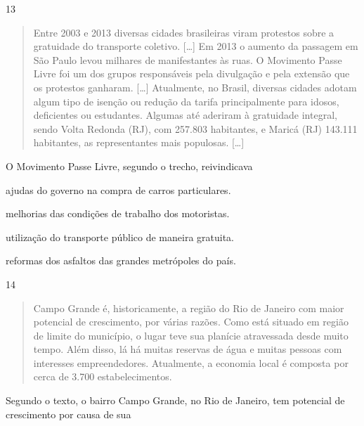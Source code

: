 \pagebreak
\num{13}

\begin{quote}
Entre 2003 e 2013 diversas cidades brasileiras viram protestos sobre a
gratuidade do transporte coletivo. {[}\ldots{}{]} Em 2013 o aumento da passagem em São
Paulo levou milhares de manifestantes às ruas. O Movimento Passe Livre
foi um dos grupos responsáveis pela divulgação e pela extensão que os
protestos ganharam. {[}\ldots{}{]} Atualmente, no Brasil, diversas cidades adotam algum
tipo de isenção ou redução da tarifa principalmente para idosos,
deficientes ou estudantes. Algumas até aderiram à gratuidade integral,
sendo Volta Redonda (RJ), com 257.803 habitantes, e Maricá (RJ) 143.111
habitantes, as representantes mais populosas. {[}\ldots{}{]}

\end{quote}

\noindent{}O Movimento Passe Livre, segundo o trecho, reivindicava

\begin{escolha}
\item ajudas do governo na compra de carros particulares.

\item melhorias das condições de trabalho dos motoristas.

\item utilização do transporte público de maneira gratuita.

\item reformas dos asfaltos das grandes metrópoles do país.
\end{escolha}



\num{14}

\begin{quote}
Campo Grande é, historicamente, a região do Rio de Janeiro com maior
potencial de crescimento, por várias razões. Como está situado em região de limite do município, o lugar teve sua planície atravessada desde muito tempo. Além disso, lá há muitas reservas de água e muitas pessoas com interesses empreendedores. Atualmente, a economia local é composta por cerca de 3.700 estabelecimentos. 
\end{quote}

\pagebreak

Segundo o texto, o bairro Campo Grande, no Rio de Janeiro, tem potencial
de crescimento por causa de sua

